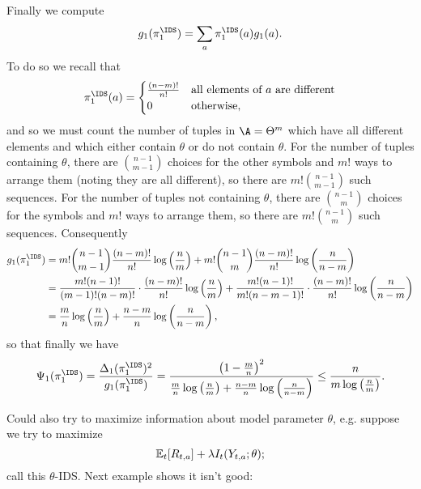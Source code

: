 \documentclass[11pt, openany]{book}
\begin{document}
\begin{example}
\begin{itemize}
\begin{itemize}
                        Finally we compute
                        \[
                            g_1(\pi_1^{\IDS}) = \sum_a \pi_1^{\IDS}(a) g_1(a).
                        \]
                        To do so we recall that
                        \[
                            \pi_1^{\IDS}(a) = \begin{cases}
                                \frac{(n-m)!}{n!} & \text{all elements of $a$ are different} \\
                                0 & \text{otherwise},
                            \end{cases}
                        \]
                        and so we must count the number of tuples in $\A=\Theta^m$ which have all different elements and which either contain $\theta$ or do not contain $\theta$. For the number of tuples containing $\theta$, there are $\binom{n-1}{m-1}$ choices for the other symbols and $m!$ ways to arrange them (noting they are all different), so there are $m!\binom{n-1}{m-1}$ such sequences. For the number of tuples not containing $\theta$, there are $\binom{n-1}{m}$ choices for the symbols and $m!$ ways to arrange them, so there are $m!\binom{n-1}{m}$ such sequences. Consequently
                        \begin{align*}
                            g_1(\pi_1^{\IDS}) & = m!\binom{n-1}{m-1} \frac{(n-m)!}{n!}\log\left(\frac{n}{m}\right) + m!\binom{n-1}{m} \frac{(n-m)!}{n!} \log\left(\frac{n}{n-m}\right) \\
                            & = \frac{m!(n-1)!}{(m-1)!(n-m)!}\cdot\frac{(n-m)!}{n!}\log\left(\frac{n}{m}\right) + \frac{m!(n-1)!}{m!(n-m-1)!} \cdot\frac{(n-m)!}{n!} \log\left(\frac{n}{n-m}\right) \\
                            & = \frac{m}{n}\log\left(\frac{n}{m}\right) + \frac{n-m}{n}\log\left(\frac{n}{n-m}\right),
                        \end{align*}
                        so that finally we have
                        \[
                            \Psi_1(\pi_1^{\IDS}) = \frac{\Delta_1(\pi_1^{\IDS})^2}{g_1(\pi_1^{\IDS})} = \frac{\left(1-\frac{m}{n}\right)^2}{\frac{m}{n}\log\left(\frac{n}{m}\right) + \frac{n-m}{n}\log\left(\frac{n}{n-m}\right)} \leq \frac{n}{m\log\left(\frac{n}{m}\right)}.
                        \]
            \end{itemize}
    \end{itemize}
\end{example}

Could also try to maximize information about model parameter $\theta$, e.g. suppose we try to maximize
\[
    \mathbb{E}_t[R_{t,a}] + \lambda I_t(Y_{t,a};\theta);
\]
call this $\theta$-IDS. Next example shows it isn't good:
\end{document}
